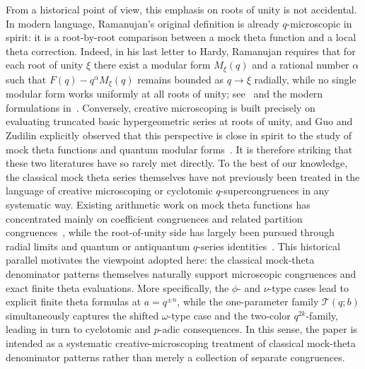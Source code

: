 \documentclass[reqno]{amsart}
\theoremstyle{definition}
\theoremstyle{plain}
\theoremstyle{remark}
\newcommand{\T}{\mathcal{T}}
\numberwithin{equation}{section}
\begin{document}
From a historical point of view, this emphasis on roots of unity is not accidental. In modern language, Ramanujan’s original definition is already $q$-microscopic in spirit: it is a root-by-root comparison between a mock theta function and a local theta correction. Indeed, in his last letter to Hardy, Ramanujan requires that for each root of unity $\xi$ there exist a modular form $M_{\xi}(q)$ and a rational number $\alpha$ such that $F(q)-q^{\alpha}M_{\xi}(q)$ remains bounded as $q\to\xi$ radially, while no single modular form works uniformly at all roots of unity; see~\cite[pp.~220--223]{berndt-rankin} and the modern formulations in~\cite{rhoades-definition,bringmann-rolen}. Conversely, creative microscoping is built precisely on evaluating truncated basic hypergeometric series at roots of unity, and Guo and Zudilin explicitly observed that this perspective is close in spirit to the study of mock theta functions and quantum modular forms~\cite[p.~4]{guo-zudilin}. It is therefore striking that these two literatures have so rarely met directly. To the best of our knowledge, the classical mock theta series themselves have not previously been treated in the language of creative microscoping or cyclotomic $q$-supercongruences in any systematic way. Existing arithmetic work on mock theta functions has concentrated mainly on coefficient congruences and related partition congruences~\cite{andersen,andrews-passary-sellers-yee,waldherr}, while the root-of-unity side has largely been pursued through radial limits and quantum or antiquantum $q$-series
identities~\cite{bringmann-rolen,folsom-metacarpa,folsom-metacarpa-anti,folsom-ono-rhoades}. This historical parallel motivates the viewpoint adopted here: the classical mock-theta denominator patterns themselves naturally support microscopic congruences and exact finite theta evaluations. More specifically, the $\phi$- and $\nu$-type cases lead to explicit finite theta formulas at $a=q^{\pm n}$, while the one-parameter family $\T(q;b)$ simultaneously captures the shifted $\omega$-type case and the two-color $q^{2k}$-family, leading in turn to cyclotomic and $p$-adic consequences. In this sense, the paper is intended as a systematic creative-microscoping treatment of classical mock-theta denominator patterns rather than merely a collection of separate congruences.

\end{document}

